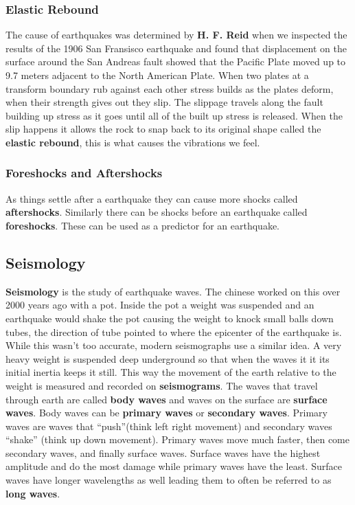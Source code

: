 \documentclass{article}
\begin{document}
\subsubsection{Elastic Rebound} %
\label{ssub:elastic_rebound}
The cause of earthquakes was determined by \textbf{H. F. Reid} when we inspected the results of the 1906 San Fransisco earthquake and found that displacement on the surface around the San Andreas fault showed that the Pacific Plate moved up to 9.7 meters adjacent to the North American Plate. When two plates at a transform boundary rub against each other stress builds as the plates deform, when their strength gives out they slip. The slippage travels along the fault building up stress as it goes until all of the built up stress is released. When the slip happens it allows the rock to snap back to its original shape called the \textbf{elastic rebound}, this is what causes the vibrations we feel.

\subsubsection{Foreshocks and Aftershocks} %
\label{ssub:foreshocks_and_aftershocks}
As things settle after a earthquake they can cause more shocks called \textbf{aftershocks}. Similarly there can be shocks before an earthquake called \textbf{foreshocks}. These can be used as a predictor for an earthquake.

\subsection{Seismology} %
\label{sub:seismology}
\textbf{Seismology} is the study of earthquake waves. The chinese worked on this over 2000 years ago with a pot. Inside the pot a weight was suspended and an earthquake would shake the pot causing the weight to knock small balls down tubes, the direction of tube pointed to where the epicenter of the earthquake is. While this wasn't too accurate, modern seismographs use a similar idea. A very heavy weight is suspended deep underground so that when the waves it it its initial inertia keeps it still. This way the movement of the earth relative to the weight is measured and recorded on \textbf{seismograms}. The waves that travel through earth are called \textbf{body waves} and waves on the surface are \textbf{surface waves}. Body waves can be \textbf{primary waves} or \textbf{secondary waves}. Primary waves are waves that ``push''(think left right movement) and secondary waves ``shake'' (think up down movement). Primary waves move much faster, then come secondary waves, and finally surface waves. Surface waves have the highest amplitude and do the most damage while primary waves have the least. Surface waves have longer wavelengths as well leading them to often be referred to as \textbf{long waves}.
\end{document}
